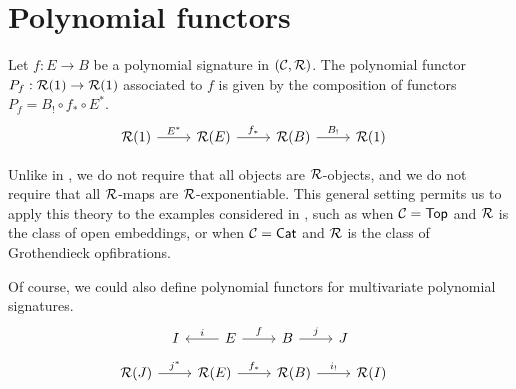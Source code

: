 \section{Polynomial functors}\label{sec:polynomial-functor}

\begin{definition}\label{def:polynomial-functor-1}
  Let $f : E \to B$ be a polynomial signature in $(\mathcal{C},\mathcal{R})$.
  The polynomial functor $P_f : \mathcal{R}(1) \to \mathcal{R}(1)$
  associated to $f$ is given by the
  composition of functors $P_f = B_! \circ f_* \circ E^*$.
  \[\begin{tikzcd}
     & {\RR(1)} & {\RR(E)} & {\RR(B)} & {\RR(1)} & 
    \arrow["{E^*}", from=1-2, to=1-3]
    \arrow["{f_*}", from=1-3, to=1-4]
    \arrow["{B_!}", from=1-4, to=1-5]
  \end{tikzcd}\]
\end{definition}

Unlike in \cite{hua2026},
we do not require that all objects are $\mathcal{R}$-objects,
and we do not require that all $\mathcal{R}$-maps
are $\mathcal{R}$-exponentiable.
This general setting permits us to apply this theory
to the examples considered in \cite{barton2026},
such as when $\mathcal{C} = \mathsf{Top}$ and $\mathcal{R}$ is the class of open embeddings,
or when $\mathcal{C} = \mathsf{Cat}$ and $\mathcal{R}$ is the class of Grothendieck opfibrations.

Of course, we could also define polynomial functors for
multivariate polynomial signatures.
\[\begin{tikzcd}
	I & E & B & J
	\arrow["i"', from=1-2, to=1-1]
	\arrow["f", from=1-2, to=1-3]
	\arrow["j", from=1-3, to=1-4]
\end{tikzcd}\]
\[\begin{tikzcd}
   & {\RR(J)} & {\RR(E)} & {\RR(B)} & {\RR(I)} & 
  \arrow["{j^*}", from=1-2, to=1-3]
  \arrow["{f_*}", from=1-3, to=1-4]
  \arrow["{i_!}", from=1-4, to=1-5]
\end{tikzcd}\]

